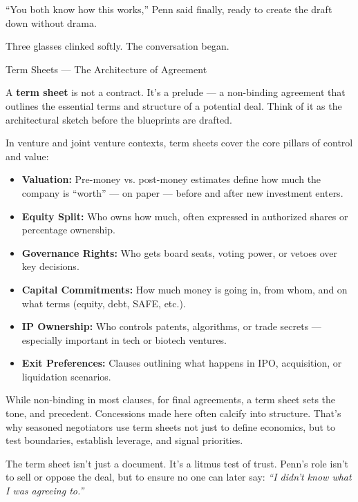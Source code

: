 ``You both know how this works,'' Penn said finally, ready to create the draft down without drama. 

Three glasses clinked softly.
The conversation began.

\medskip

\begin{TechnicalSidebar}{Term Sheets — The Architecture of Agreement}

  A \textbf{term sheet} is not a contract. It’s a prelude — a non-binding agreement that outlines the essential terms 
  and structure of a potential deal. Think of it as the architectural sketch before the blueprints are drafted.
  
  \medskip
  
  In venture and joint venture contexts, term sheets cover the core pillars of control and value:

  \medskip
  
  \begin{itemize}
    \item \textbf{Valuation:} Pre-money vs. post-money estimates define how much the company is “worth” — on paper — 
    before and after new investment enters.
    \item \textbf{Equity Split:} Who owns how much, often expressed in authorized shares or percentage ownership.
    \item \textbf{Governance Rights:} Who gets board seats, voting power, or vetoes over key decisions.
    \item \textbf{Capital Commitments:} How much money is going in, from whom, and on what terms (equity, debt, SAFE, etc.).
    \item \textbf{IP Ownership:} Who controls patents, algorithms, or trade secrets — especially important in tech or 
    biotech ventures.
    \item \textbf{Exit Preferences:} Clauses outlining what happens in IPO, acquisition, or liquidation scenarios.
  \end{itemize}
  
  \medskip
  
  While non-binding in most clauses, for final agreements, a term sheet sets the tone, and precedent. Concessions made 
  here often calcify into structure. That’s why seasoned negotiators use term sheets not just to define economics, but to 
  test boundaries, establish leverage, and signal priorities.
  
  \medskip
  
  The term sheet isn’t just a document. It’s a litmus test of trust. Penn’s role isn’t to sell 
  or oppose the deal, but to ensure no one can later say: \textit{``I didn’t know what I was agreeing to.''}
  
\end{TechnicalSidebar}

